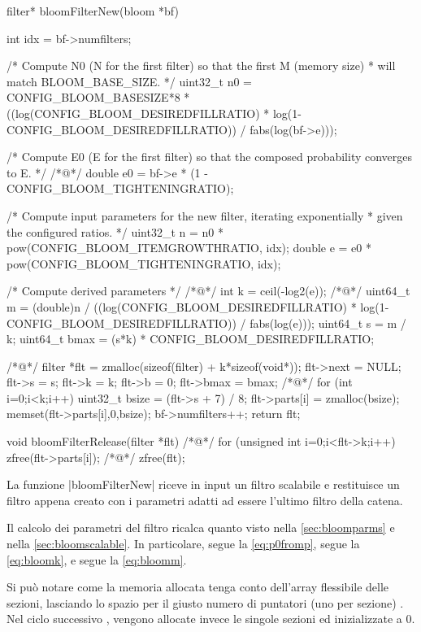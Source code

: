 \begin{commentedsource}[style=csource,caption=Creazione e distruzione di un filtro,label={lst:bloomFilterNew}]
filter* bloomFilterNew(bloom *bf) {
    int idx = bf->numfilters;

    /* Compute N0 (N for the first filter) so that the first M (memory size)
     * will match BLOOM_BASE_SIZE. */
    uint32_t n0 = CONFIG_BLOOM_BASESIZE*8 * ((log(CONFIG_BLOOM_DESIREDFILLRATIO) * log(1-CONFIG_BLOOM_DESIREDFILLRATIO)) / fabs(log(bf->e)));

    /* Compute E0 (E for the first filter) so that the composed probability converges to E. */
/*@\lnote@*/    double e0 = bf->e * (1 - CONFIG_BLOOM_TIGHTENINGRATIO);

    /* Compute input parameters for the new filter, iterating exponentially
     * given the configured ratios. */
    uint32_t n = n0 * pow(CONFIG_BLOOM_ITEMGROWTHRATIO, idx);
    double e = e0 * pow(CONFIG_BLOOM_TIGHTENINGRATIO, idx);

    /* Compute derived parameters */
/*@\lnote@*/    int k = ceil(-log2(e));
/*@\lnote@*/    uint64_t m = (double)n / ((log(CONFIG_BLOOM_DESIREDFILLRATIO) * log(1-CONFIG_BLOOM_DESIREDFILLRATIO)) / fabs(log(e)));
    uint64_t s = m / k;
    uint64_t bmax = (s*k) * CONFIG_BLOOM_DESIREDFILLRATIO;

/*@\lnote@*/    filter *flt = zmalloc(sizeof(filter) + k*sizeof(void*));
    flt->next = NULL;
    flt->s = s;
    flt->k = k;
    flt->b = 0;
    flt->bmax = bmax;
/*@\lnote@*/    for (int i=0;i<k;i++) {
        uint32_t bsize = (flt->s + 7) / 8;
        flt->parts[i] = zmalloc(bsize);
        memset(flt->parts[i],0,bsize);
    }
    bf->numfilters++;
    return flt;
}

void bloomFilterRelease(filter *flt) {
/*@\lnote@*/    for (unsigned int i=0;i<flt->k;i++)
        zfree(flt->parts[i]);
/*@\lnote@*/    zfree(flt);
}
\end{commentedsource}

La funzione \cverb|bloomFilterNew| riceve in input un filtro scalabile e restituisce un filtro appena
creato con i parametri adatti ad essere l'ultimo filtro della catena.

Il calcolo dei parametri del filtro ricalca quanto visto nella \autoref{sec:bloomparms} e nella
\autoref{sec:bloomscalable}. In particolare,  segue la \autoref{eq:p0fromp},  
segue la \autoref{eq:bloomk}, e  segue la \autoref{eq:bloomm}.

Si può notare come la memoria allocata tenga conto dell'array flessibile delle sezioni, lasciando lo
spazio per il giusto numero di puntatori (uno per sezione) . Nel ciclo successivo
, vengono allocate invece le singole sezioni ed inizializzate a $0$.

